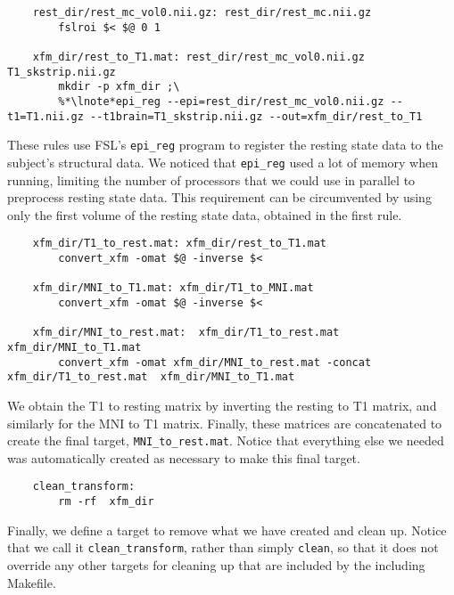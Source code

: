\begin{lstlisting}
	rest_dir/rest_mc_vol0.nii.gz: rest_dir/rest_mc.nii.gz
		fslroi $< $@ 0 1

	xfm_dir/rest_to_T1.mat: rest_dir/rest_mc_vol0.nii.gz T1_skstrip.nii.gz
		mkdir -p xfm_dir ;\
		%*\lnote*epi_reg --epi=rest_dir/rest_mc_vol0.nii.gz --t1=T1.nii.gz --t1brain=T1_skstrip.nii.gz --out=xfm_dir/rest_to_T1
\end{lstlisting}

These rules use FSL's \texttt{epi_reg} program to register the resting
state data to the subject's structural data. We noticed that
\texttt{epi_reg} used a lot of memory when running, limiting the
number of processors that we could use in parallel to preprocess
resting state data. \lnum{3} This requirement can be circumvented by using only
the first volume of the resting state data, obtained in the first
rule. 


\begin{lstlisting}
	xfm_dir/T1_to_rest.mat: xfm_dir/rest_to_T1.mat
		convert_xfm -omat $@ -inverse $<

	xfm_dir/MNI_to_T1.mat: xfm_dir/T1_to_MNI.mat
		convert_xfm -omat $@ -inverse $<

	xfm_dir/MNI_to_rest.mat:  xfm_dir/T1_to_rest.mat xfm_dir/MNI_to_T1.mat
		convert_xfm -omat xfm_dir/MNI_to_rest.mat -concat xfm_dir/T1_to_rest.mat  xfm_dir/MNI_to_T1.mat
\end{lstlisting}
We obtain the T1 to resting matrix by inverting the resting to T1
matrix, and similarly for the MNI to T1 matrix. Finally, these
matrices are concatenated to create the final target,
\texttt{MNI_to_rest.mat}. Notice that everything else we needed was
automatically created as necessary to make this final target.


\begin{lstlisting}
	clean_transform: 
		rm -rf  xfm_dir 
\end{lstlisting}
Finally, we define a target to remove what we have created and clean
up. Notice that we call it \texttt{clean_transform}, rather than simply
\texttt{clean}, so that it does not override any other targets for
cleaning up that are included by the including Makefile. 